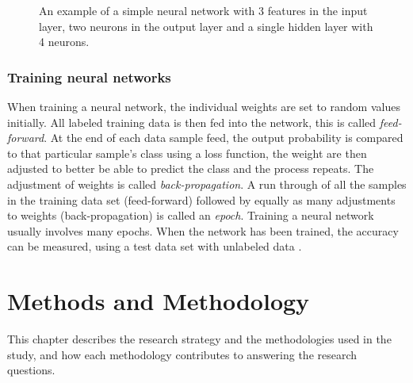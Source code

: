\documentclass[12pt, a4paper, onecolumn]{article}
\begin{document}
	\begin{figure}[H]
		\centering
		\caption{An example of a simple neural network with 3 features in the input layer, two neurons in the output layer and a single hidden layer with 4 neurons.}%
		\label{fig:neural-network-overview}%
	\end{figure} 
	
	\subsubsection{Training neural networks}
	When training a neural network, the individual weights are set to random values initially. All labeled training data is then fed into the network, this is called \textit{feed-forward}. At the end of each data sample feed, the output probability is compared to that particular sample's class using a loss function, the weight are then adjusted to better be able to predict the class and the process repeats. The adjustment of weights is called \textit{back-propagation}. A run through of all the samples in the training data set (feed-forward) followed by equally as many adjustments to weights (back-propagation) is called an \textit{epoch}. Training a neural network usually involves many epochs. When the network has been trained, the accuracy can be measured, using a test data set with unlabeled data \cite{neural_networks}.
	
	
	\newpage
	\section{Methods and Methodology}
	
	This chapter describes the research strategy and the methodologies used in the study, and how each methodology contributes to answering the research questions.
	
\end{document}
